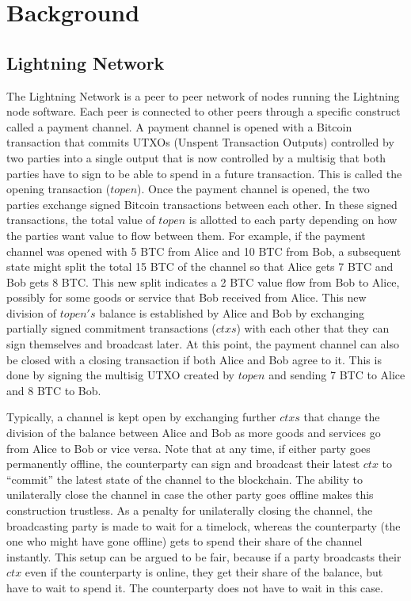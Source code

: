 \section{Background}
\subsection{Lightning Network}
The Lightning Network is a peer to peer network of nodes running the Lightning node software. Each peer is connected to other peers through a specific construct called a payment channel. A payment channel is opened with a Bitcoin transaction that commits UTXOs (Unspent Transaction Outputs) controlled by two parties into a single output that is now controlled by a multisig that both parties have to sign to be able to spend in a future transaction. This is called the opening transaction ($topen$). Once the payment channel is opened, the two parties exchange signed Bitcoin transactions between each other. In these signed transactions, the total value of $topen$ is allotted to each party depending on how the parties want value to flow between them. For example, if the payment channel was opened with 5 BTC from Alice and 10 BTC from Bob, a subsequent state might split the total 15 BTC of the channel so that Alice gets 7 BTC and Bob gets 8 BTC. This new split indicates a 2 BTC value flow from Bob to Alice, possibly for some goods or service that Bob received from Alice. This new division of $\mathit{topen's}$ balance is established by Alice and Bob by exchanging partially signed commitment transactions ($\mathit{ctxs}$) with each other that they can sign themselves and broadcast later. At this point, the payment channel can also be closed with a closing transaction if both Alice and Bob agree to it. This is done by signing the multisig UTXO created by $\mathit{topen}$ and sending 7 BTC to Alice and 8 BTC to Bob. 

Typically, a channel is kept open by exchanging further $\mathit{ctxs}$ that change the division of the balance between Alice and Bob as more goods and services go from Alice to Bob or vice versa. Note that at any time, if either party goes permanently offline, the counterparty can sign and broadcast their latest $\mathit{ctx}$ to ``commit'' the latest state of the channel to the blockchain. The ability to unilaterally close the channel in case the other party goes offline makes this construction trustless. As a penalty for unilaterally closing the channel, the broadcasting party is made to wait for a timelock, whereas the counterparty (the one who might have gone offline) gets to spend their share of the channel instantly. This setup can be argued to be fair, because if a party broadcasts their $\mathit{ctx}$ even if the counterparty is online, they get their share of the balance, but have to wait to spend it. The counterparty does not have to wait in this case.

